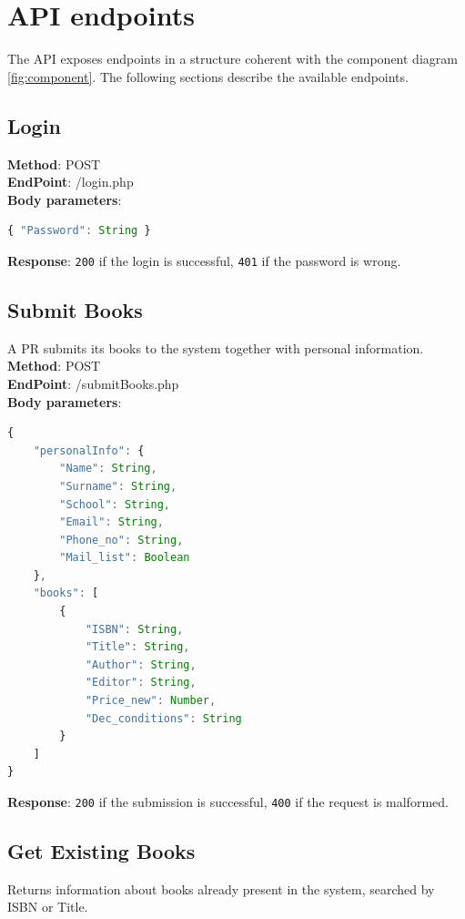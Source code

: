\section{API endpoints}

The API exposes endpoints in a structure coherent with the component diagram \ref{fig:component}. The following sections describe the available endpoints.

\subsection{Login}
\textbf{Method}: POST \\
\textbf{EndPoint}: /login.php \\
\textbf{Body parameters}:
\begin{lstlisting}[language=JavaScript, basicstyle=\ttfamily]
{ "Password": String }
\end{lstlisting}

\textbf{Response}: \texttt{200} if the login is successful, \texttt{401} if the password is wrong.

\subsection{Submit Books}
A PR submits its books to the system together with personal information.\\

\textbf{Method}: POST \\
\textbf{EndPoint}: /submitBooks.php \\
\textbf{Body parameters}:
\begin{lstlisting}[language=JavaScript, basicstyle=\ttfamily]
{
    "personalInfo": {
        "Name": String,
        "Surname": String,
        "School": String,
        "Email": String,
        "Phone_no": String,
        "Mail_list": Boolean
    },
    "books": [
        {
            "ISBN": String,
            "Title": String,
            "Author": String,
            "Editor": String,
            "Price_new": Number,
            "Dec_conditions": String
        }
    ]
}
\end{lstlisting}

\textbf{Response}: \texttt{200} if the submission is successful, \texttt{400} if the request is malformed.

\subsection{Get Existing Books}
Returns information about books already present in the system, searched by ISBN or Title.\\


